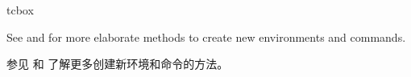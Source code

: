 \begin{docCommand}{tcbox}{}
% 
% 






\end{docCommand}


\begin{marker}
See  and  for more
elaborate methods to create new environments and commands.

参见  和  了解更多创建新环境和命令的方法。%
\end{marker}